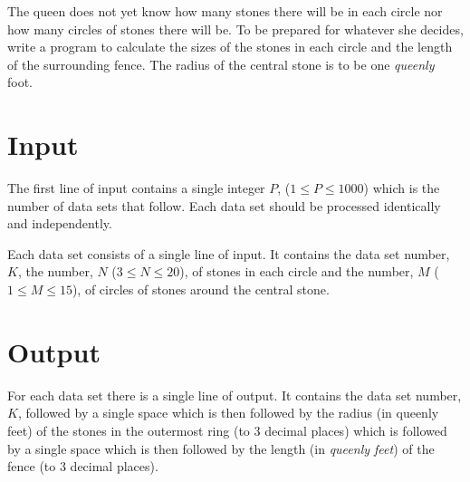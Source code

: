 The queen does not yet know how many stones there will be in each
circle nor how many circles of stones there will be.  To be prepared
for whatever she decides, write a program to calculate the sizes of
the stones in each circle and the length of the surrounding fence.
The radius of the central stone is to be one \emph{queenly} foot.

\section*{Input}

The first line of input contains a single integer $P$, ($1 \le P \le 1000$)
which is the number of data sets that follow.  Each data set should be
processed identically and independently.

Each data set consists of a single line of input.  It contains the
data set number, $K$, the number, $N$ ($3 \le N \le 20$), of stones in each
circle and the number, $M$ ($1 \le M \le 15$), of circles of stones around
the central stone.

\section*{Output}

For each data set there is a single line of output.  It contains the
data set number, $K$, followed by a single space which is then followed by
the radius (in queenly feet) of the stones in the outermost ring (to $3$
decimal places) which is followed by a single space which is then followed
by the length (in \emph{queenly feet}) of the fence (to $3$ decimal places).

